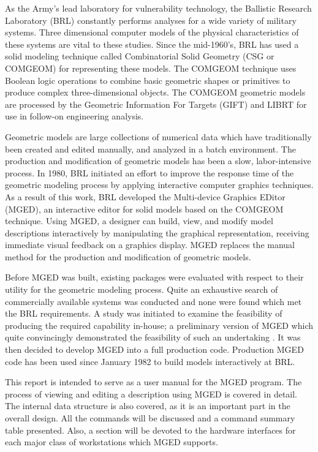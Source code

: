 As the Army's lead laboratory for vulnerability technology, the
Ballistic Research Laboratory (BRL) constantly performs
analyses for a wide variety of military systems.
Three dimensional computer models of the
physical characteristics of these systems
are vital to these studies.
Since the mid-1960's, BRL has used a solid modeling technique
called Combinatorial Solid Geometry (CSG or COMGEOM)
for representing these models.
The COMGEOM technique uses
Boolean logic operations to combine basic geometric
shapes or primitives to produce complex three-dimensional objects.
The COMGEOM geometric models are processed by 
the Geometric Information
For Targets (GIFT)
\cite{gift1,gift2}
and LIBRT
\cite{solid-models}
for use in follow-on engineering analysis.

Geometric models are large collections
of numerical data which have traditionally
been created and edited manually, and analyzed in a batch environment.
The production and modification of geometric models has been a slow,
labor-intensive
process.
In 1980, BRL initiated an effort to improve the response
time of the geometric modeling process by applying interactive
computer graphics techniques.
As a result of this work, BRL
developed the Multi-device Graphics EDitor (MGED),
an interactive editor for solid models
based on the COMGEOM technique.
Using MGED, a designer can build, view, and modify model descriptions
interactively by manipulating the graphical representation,
receiving immediate visual feedback on a graphics display.
MGED replaces the manual method for the production
and modification of geometric models.

Before MGED was built,
existing packages were evaluated with respect to
their utility for the geometric modeling process.
Quite an exhaustive search of commercially available systems
was conducted and none were found which met
the BRL requirements.
A study was initiated to examine the feasibility of producing
the required capability in-house;
a preliminary version of MGED which
quite convincingly demonstrated the
feasibility of such an undertaking \cite{interactive-construction}.
It was then decided to develop MGED into a full production code.
Production MGED code has been used since January 1982 to
build models interactively at BRL.

This report is intended to serve as  a user manual
for the MGED program.
The process of viewing and editing a description using MGED
is covered in detail.  The internal data structure is also covered, as
it is an important part in the overall design.
All the commands will be discussed and a command summary table presented.
Also, a section will be devoted to the hardware interfaces for each
major class of workstations which MGED supports.

